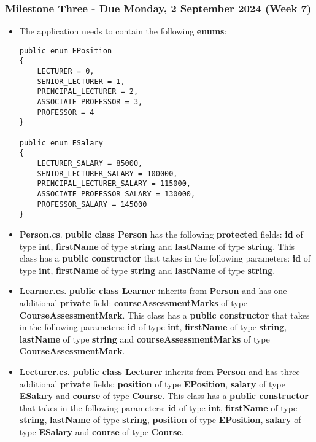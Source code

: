 \documentclass{article}
\begin{document}
\subsubsection*{Milestone Three - Due Monday, 2 September 2024 (Week 7)}

\begin{itemize}
    \item The application needs to contain the following \textbf{enums}:
    \begin{verbatim}
public enum EPosition
{
    LECTURER = 0,
    SENIOR_LECTURER = 1,
    PRINCIPAL_LECTURER = 2,
    ASSOCIATE_PROFESSOR = 3,
    PROFESSOR = 4
}
            
public enum ESalary
{
    LECTURER_SALARY = 85000,
    SENIOR_LECTURER_SALARY = 100000,
    PRINCIPAL_LECTURER_SALARY = 115000,
    ASSOCIATE_PROFESSOR_SALARY = 130000,
    PROFESSOR_SALARY = 145000
}
    \end{verbatim}
    \item \textbf{Person.cs}. \textbf{public class Person} has the following \textbf{protected} fields: \textbf{id} of type \textbf{int}, \textbf{firstName} of type \textbf{string} and \textbf{lastName} of type \textbf{string}. This class has a \textbf{public constructor} that takes in the following parameters: \textbf{id} of type \textbf{int}, \textbf{firstName} of type \textbf{string} and \textbf{lastName} of type \textbf{string}.
    \item \textbf{Learner.cs}. \textbf{public class Learner} inherits from \textbf{Person} and has one additional \textbf{private} field: \textbf{courseAssessmentMarks} of type \textbf{CourseAssessmentMark}. This class has a \textbf{public constructor} that takes in the following parameters: \textbf{id} of type \textbf{int}, \textbf{firstName} of type \textbf{string}, \textbf{lastName} of type \textbf{string} and \textbf{courseAssessmentMarks} of type \textbf{CourseAssessmentMark}. 
    \item \textbf{Lecturer.cs}. \textbf{public class Lecturer} inherits from \textbf{Person} and has three additional \textbf{private} fields: \textbf{position} of type \textbf{EPosition}, \textbf{salary} of type \textbf{ESalary} and \textbf{course} of type \textbf{Course}. This class has a \textbf{public constructor} that takes in the following parameters: \textbf{id} of type \textbf{int}, \textbf{firstName} of type \textbf{string}, \textbf{lastName} of type \textbf{string}, \textbf{position} of type \textbf{EPosition}, \textbf{salary} of type \textbf{ESalary} and \textbf{course} of type \textbf{Course}. 
\end{itemize}
\end{document}
